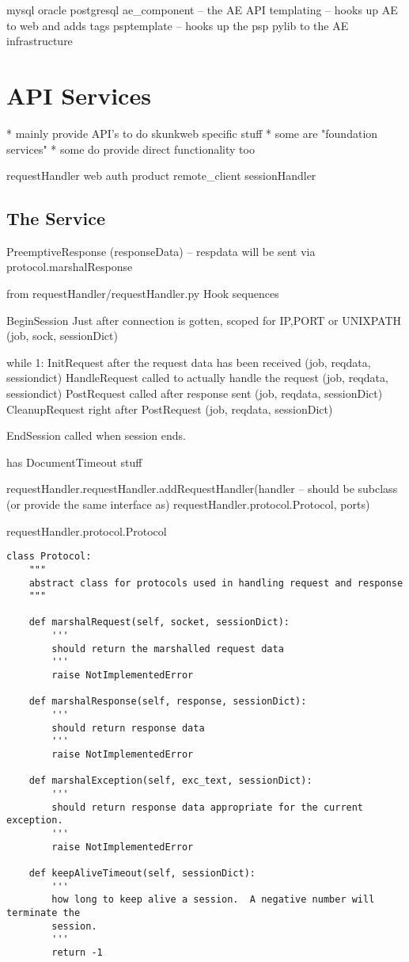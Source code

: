 \documentclass{manual}
\begin{document}
       mysql
       oracle
       postgresql
       ae_component -- the AE API
       templating -- hooks up AE to web and adds tags
       psptemplate -- hooks up the psp pylib to the AE infrastructure
	
\section{API Services}
       * mainly provide API's to do skunkweb specific stuff
       * some are "foundation services"
       * some do provide direct functionality too

       requestHandler
       web
       auth
       product 
       remote\_client
       sessionHandler

\subsection{The  Service}
PreemptiveResponse (responseData) -- respdata will be sent via
protocol.marshalResponse

from requestHandler/requestHandler.py
Hook sequences

BeginSession  Just after connection is gotten, scoped for IP,PORT or UNIXPATH (job, sock, sessionDict)

while 1:
    InitRequest     after the request data has been received (job, reqdata, sessiondict)
    HandleRequest   called to actually handle the request (job, reqdata, sessiondict)
    PostRequest     called after response sent (job, reqdata, sessionDict)
    CleanupRequest  right after PostRequest (job, reqdata, sessionDict)

EndSession called when session ends.



has DocumentTimeout stuff

requestHandler.requestHandler.addRequestHandler(handler -- should be
    subclass (or provide the same interface as)
    requestHandler.protocol.Protocol, ports)


requestHandler.protocol.Protocol

\begin{verbatim}
class Protocol:
    """
    abstract class for protocols used in handling request and response
    """

    def marshalRequest(self, socket, sessionDict):
        '''
        should return the marshalled request data
        '''
        raise NotImplementedError

    def marshalResponse(self, response, sessionDict):
        '''
        should return response data
        '''
        raise NotImplementedError

    def marshalException(self, exc_text, sessionDict):
        '''
        should return response data appropriate for the current exception.
        '''
        raise NotImplementedError

    def keepAliveTimeout(self, sessionDict):
        '''
        how long to keep alive a session.  A negative number will terminate the
        session.
        '''
        return -1
\end{verbatim}
\end{document}
